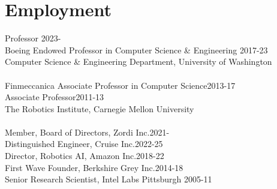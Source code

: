 
\section{Employment}
\noindent
Professor \hfill 2023-\phantom{20}\\
Boeing Endowed Professor in Computer Science \& Engineering \hfill 2017-23\\
Computer Science \& Engineering Department, 
University of Washington\\
\\
Finmeccanica Associate Professor in Computer Science\hfill 2013-17\\
Associate Professor\hfill 2011-13\\
The Robotics Institute,  Carnegie Mellon University\\
\\
Member, Board of Directors, Zordi Inc.\hfill 2021-\phantom{20}\\
Distinguished Engineer, Cruise Inc.\hfill 2022-25\\
Director, Robotics AI, Amazon Inc.\hfill 2018-22\\
First Wave Founder, Berkshire Grey Inc.\hfill 2014-18\\
Senior Research Scientist, Intel Labs Pittsburgh \hfill 2005-11

